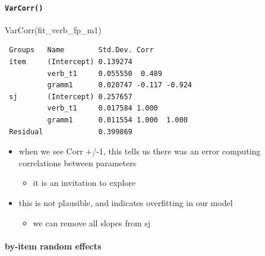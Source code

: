 \documentclass[
  letterpaper,
  DIV=11,
  numbers=noendperiod]{scrartcl}
\let\oldparagraph\paragraph
\renewcommand{\paragraph}[1]{\oldparagraph{#1}\mbox{}}
\newenvironment{Shaded}{\begin{snugshade}}{\end{snugshade}}
\newcommand{\FunctionTok}[1]{\textcolor[rgb]{0.28,0.35,0.67}{#1}}
\newcommand{\NormalTok}[1]{\textcolor[rgb]{0.00,0.23,0.31}{#1}}
\newcommand{\SpecialCharTok}[1]{\textcolor[rgb]{0.37,0.37,0.37}{#1}}
\providecommand{\tightlist}{%
  \setlength{\itemsep}{0pt}\setlength{\parskip}{0pt}}\usepackage{longtable,booktabs,array}
\begin{document}
\hypertarget{varcorr}{%
\paragraph{\texorpdfstring{\texttt{VarCorr()}}{VarCorr()}}\label{varcorr}}

\begin{Shaded}
\begin{Highlighting}[]
\FunctionTok{VarCorr}\NormalTok{(fit\_verb\_fp\_m1)}
\end{Highlighting}
\end{Shaded}

\begin{verbatim}
 Groups   Name        Std.Dev. Corr         
 item     (Intercept) 0.139274              
          verb_t1     0.055550  0.489       
          gramm1      0.020747 -0.117 -0.924
 sj       (Intercept) 0.257657              
          verb_t1     0.017584 1.000        
          gramm1      0.011554 1.000  1.000 
 Residual             0.399869              
\end{verbatim}

\begin{itemize}
\tightlist
\item
  when we see Corr +/-1, this tells us there was an error computing
  correlations between parameters

  \begin{itemize}
  \tightlist
  \item
    it is an invitation to explore
  \end{itemize}
\item
  this is not plausible, and indicates overfitting in our model

  \begin{itemize}
  \tightlist
  \item
    we can remove all slopes from sj
  \end{itemize}
\end{itemize}

\hypertarget{by-item-random-effects}{%
\paragraph{by-item random effects}\label{by-item-random-effects}}

\begin{Shaded}
\end{Shaded}
\end{document}
